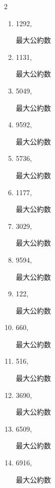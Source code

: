 \begin{multicols}{2}
\begin{enumerate}
  \item 1292,

        最大公約数

\columnbreak %

\resetques

  \item 1131,

        最大公約数

  \item 5049,

        最大公約数

  \item 9592,

        最大公約数

  \item 5736,

        最大公約数

  \item 1177,

        最大公約数

\columnbreak %

  \item 3029,

        最大公約数

  \item 9594,

        最大公約数

  \item 122,

        最大公約数

  \item 660,

        最大公約数

  \item 516,

        最大公約数

\columnbreak %

\resetques

  \item 3690,

        最大公約数

  \item 6509,

        最大公約数

  \item 6916,

        最大公約数


\end{enumerate}
\end{multicols}
